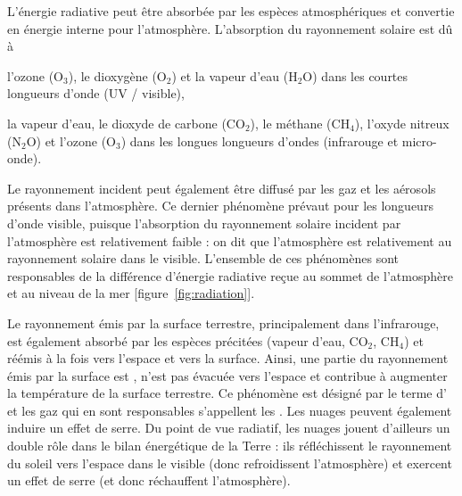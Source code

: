 \sk
L'énergie radiative peut être absorbée par les espèces atmosphériques et convertie en énergie interne pour l'atmosphère. L’absorption du rayonnement solaire est dû à 
\begin{finger}
\item l’ozone (O$_3$), le dioxygène (O$_2$) et la vapeur d’eau (H$_2$O) dans les courtes longueurs d’onde (UV / visible),
\item la vapeur d’eau, le dioxyde de carbone (CO$_2$), le méthane (CH$_4$), l’oxyde nitreux (N$_2$O) et l’ozone (O$_3$) dans les longues longueurs d’ondes (infrarouge et micro-onde).
\end{finger}
Le rayonnement incident peut également être diffusé par les gaz et les aérosols présents dans l'atmosphère. Ce dernier phénomène prévaut pour les longueurs d'onde visible, puisque l'absorption du rayonnement solaire incident par l'atmosphère est relativement faible : on dit que l’atmosphère est relativement  au rayonnement solaire dans le visible. L'ensemble de ces phénomènes sont responsables de la différence d'énergie radiative reçue au sommet de l'atmosphère et au niveau de la mer [figure~\ref{fig:radiation}]. 


\sk
Le rayonnement émis par la surface terrestre, principalement dans l'infrarouge, est également absorbé par les espèces précitées (vapeur d'eau, CO$_2$, CH$_4$) et réémis à la fois vers l'espace et vers la surface. Ainsi, une partie du rayonnement émis par la surface est , n'est pas évacuée vers l'espace et contribue à augmenter la température de la surface terrestre. Ce phénomène est désigné par le terme d' et les gaz qui en sont responsables s'appellent les . Les nuages peuvent également induire un effet de serre. Du point de vue radiatif, les nuages jouent d'ailleurs un double rôle dans le bilan énergétique de la Terre : ils réfléchissent le rayonnement du soleil vers l’espace dans le visible (donc refroidissent l'atmosphère) et exercent un effet de serre (et donc réchauffent l'atmosphère). 


